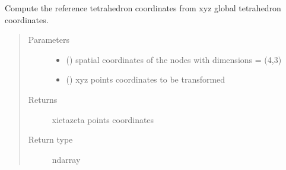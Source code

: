 \documentclass[letterpaper,10pt,english]{sphinxmanual}
\begin{document}

\begin{fulllineitems}
\label{\detokenize{petgem/hvfem:petgem.hvfem.tetrahedronXYZToXiEtaZeta}}
Compute the reference tetrahedron coordinates from xyz global tetrahedron coordinates.
\begin{quote}\begin{description}
\item[{Parameters}] \leavevmode\begin{itemize}
\item {} 
 () \textendash{} spatial coordinates of the nodes with dimensions = (4,3)

\item {} 
 () \textendash{} xyz points coordinates to be transformed

\end{itemize}

\item[{Returns}] \leavevmode
xietazeta points coordinates

\item[{Return type}] \leavevmode
ndarray

\end{description}\end{quote}

\end{fulllineitems}

\end{document}
